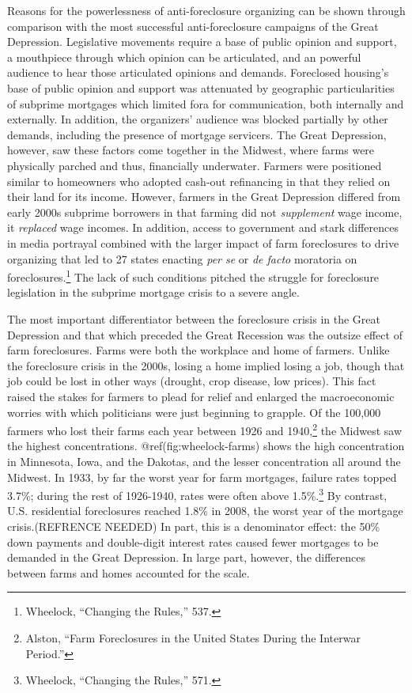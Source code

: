 \documentclass[
]{article}
\let\rmarkdownfootnote\footnote%
\def\footnote{\protect\rmarkdownfootnote}
\begin{document}
Reasons for the powerlessness of anti-foreclosure organizing can be
shown through comparison with the most successful anti-foreclosure
campaigns of the Great Depression. Legislative movements require a base
of public opinion and support, a mouthpiece through which opinion can be
articulated, and an powerful audience to hear those articulated opinions
and demands. Foreclosed housing's base of public opinion and support was
attenuated by geographic particularities of subprime mortgages which
limited fora for communication, both internally and externally. In
addition, the organizers' audience was blocked partially by other
demands, including the presence of mortgage servicers. The Great
Depression, however, saw these factors come together in the Midwest,
where farms were physically parched and thus, financially underwater.
Farmers were positioned similar to homeowners who adopted cash-out
refinancing in that they relied on their land for its income. However,
farmers in the Great Depression differed from early 2000s subprime
borrowers in that farming did not \emph{supplement} wage income, it
\emph{replaced} wage incomes. In addition, access to government and
stark differences in media portrayal combined with the larger impact of
farm foreclosures to drive organizing that led to 27 states enacting
\emph{per se} or \emph{de facto} moratoria on foreclosures.\footnote{Wheelock,
  ``Changing the Rules,'' 537.} The lack of such conditions pitched the
struggle for foreclosure legislation in the subprime mortgage crisis to
a severe angle.

The most important differentiator between the foreclosure crisis in the
Great Depression and that which preceded the Great Recession was the
outsize effect of farm foreclosures. Farms were both the workplace and
home of farmers. Unlike the foreclosure crisis in the 2000s, losing a
home implied losing a job, though that job could be lost in other ways
(drought, crop disease, low prices). This fact raised the stakes for
farmers to plead for relief and enlarged the macroeconomic worries with
which politicians were just beginning to grapple. Of the 100,000 farmers
who lost their farms each year between 1926 and 1940,\footnote{Alston,
  ``Farm Foreclosures in the United States During the Interwar Period.''}
the Midwest saw the highest concentrations. @ref(fig:wheelock-farms)
shows the high concentration in Minnesota, Iowa, and the Dakotas, and
the lesser concentration all around the Midwest. In 1933, by far the
worst year for farm mortgages, failure rates topped 3.7\%; during the
rest of 1926-1940, rates were often above 1.5\%.\footnote{Wheelock,
  ``Changing the Rules,'' 571.} By contrast, U.S. residential
foreclosures reached 1.8\% in 2008, the worst year of the mortgage
crisis.(REFRENCE NEEDED) In part, this is a denominator effect: the 50\%
down payments and double-digit interest rates caused fewer mortgages to
be demanded in the Great Depression. In large part, however, the
differences between farms and homes accounted for the scale.
\end{document}
